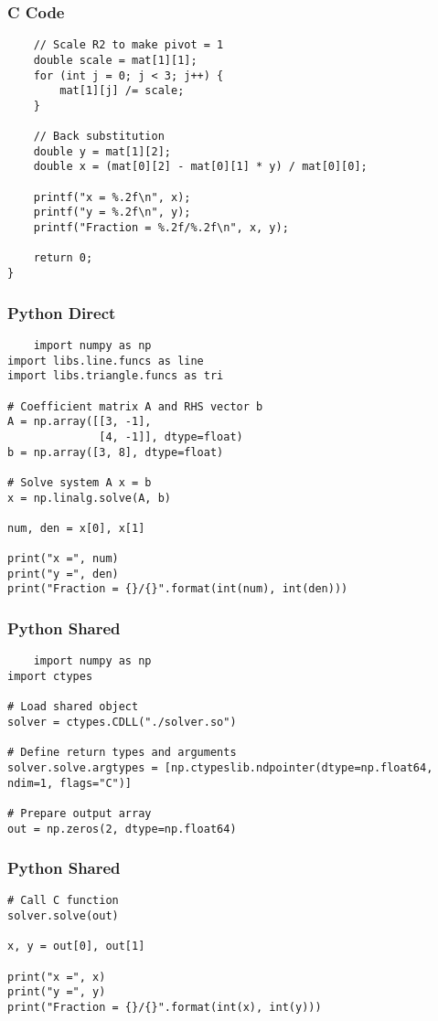 \documentclass{beamer}
\begin{document}
\begin{frame}[fragile]
\frametitle{C Code}
\begin{lstlisting}
    // Scale R2 to make pivot = 1
    double scale = mat[1][1];
    for (int j = 0; j < 3; j++) {
        mat[1][j] /= scale;
    }

    // Back substitution
    double y = mat[1][2];
    double x = (mat[0][2] - mat[0][1] * y) / mat[0][0];

    printf("x = %.2f\n", x);
    printf("y = %.2f\n", y);
    printf("Fraction = %.2f/%.2f\n", x, y);

    return 0;
}

\end{lstlisting}  
\end{frame}
\begin{frame}[fragile]
\frametitle{Python Direct}
\begin{lstlisting}
    import numpy as np
import libs.line.funcs as line
import libs.triangle.funcs as tri

# Coefficient matrix A and RHS vector b
A = np.array([[3, -1],
              [4, -1]], dtype=float)
b = np.array([3, 8], dtype=float)

# Solve system A x = b
x = np.linalg.solve(A, b)

num, den = x[0], x[1]

print("x =", num)
print("y =", den)
print("Fraction = {}/{}".format(int(num), int(den)))

\end{lstlisting}  
\end{frame}
\begin{frame}[fragile]
\frametitle{Python Shared}
\begin{lstlisting}
    import numpy as np
import ctypes

# Load shared object
solver = ctypes.CDLL("./solver.so")

# Define return types and arguments
solver.solve.argtypes = [np.ctypeslib.ndpointer(dtype=np.float64, ndim=1, flags="C")]

# Prepare output array
out = np.zeros(2, dtype=np.float64)
\end{lstlisting}  
\end{frame}
\begin{frame}[fragile]
\frametitle{Python Shared}
\begin{lstlisting}
# Call C function
solver.solve(out)

x, y = out[0], out[1]

print("x =", x)
print("y =", y)
print("Fraction = {}/{}".format(int(x), int(y)))

\end{lstlisting}  
\end{frame}
\end{document}
